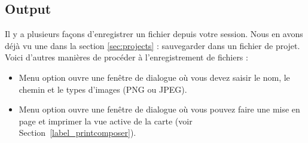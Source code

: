
\subsection{Output}\label{sec:output}
Il y a plusieurs fa\c{c}ons d'enregistrer un fichier depuis votre session. Nous en avons d\'ej\`a vu une dans la section \ref{sec:projects} : sauvegarder dans un fichier de projet.
Voici d'autres mani\`eres de proc\'eder \`a l'enregistrement de fichiers :
\begin{itemize}
\item Menu option  ouvre une fen\^etre de dialogue o\`u vous devez saisir le nom, le chemin et le types d'images (PNG ou JPEG).
\item Menu option  ouvre une fen\^etre de dialogue o\`u vous pouvez faire une mise en page et imprimer la vue active de la carte (voir Section~\ref{label_printcomposer}).
\end{itemize}


